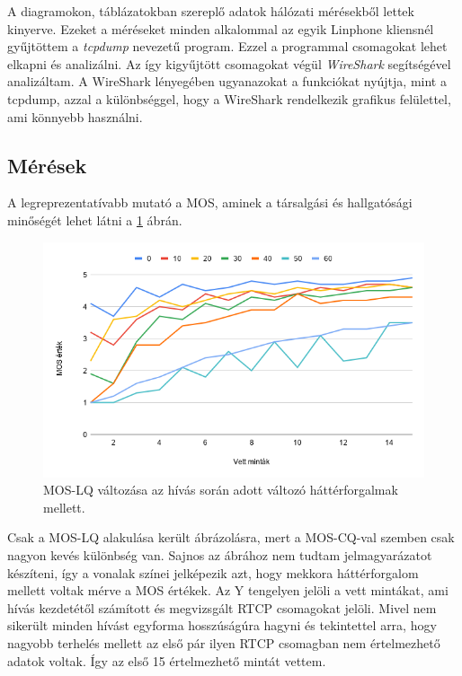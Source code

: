 A diagramokon, táblázatokban szereplő adatok hálózati mérésekből lettek kinyerve. Ezeket a méréseket 
minden alkalommal az egyik Linphone kliensnél gyűjtöttem a \textit{tcpdump} nevezetű program. Ezzel 
a programmal csomagokat lehet elkapni és analizálni. Az így kigyűjtött csomagokat végül \textit{WireShark}
segítségével analizáltam. A WireShark lényegében ugyanazokat a funkciókat nyújtja, mint a tcpdump, azzal
a különbséggel, hogy a WireShark rendelkezik grafikus felülettel, ami könnyebb használni. 

\subsection{Mérések}

A legreprezentatívabb mutató a MOS, aminek a társalgási és hallgatósági minőségét lehet látni a \ref{fig:moslq}
ábrán.

\begin{figure}[!ht]
	\centering
	\includegraphics[width=1\textwidth, keepaspectratio]{figures/moslq.png}
	\caption{MOS-LQ változása az hívás során adott változó háttérforgalmak mellett.}
	\label{fig:moslq}
\end{figure}

Csak a MOS-LQ alakulása került ábrázolásra, mert a MOS-CQ-val szemben csak nagyon kevés különbség
van. Sajnos az ábrához nem tudtam jelmagyarázatot készíteni, így a vonalak színei jelképezik azt, hogy
mekkora háttérforgalom mellett voltak mérve a MOS értékek. Az Y tengelyen jelöli a vett mintákat, 
ami hívás kezdetétől számított és megvizsgált RTCP csomagokat jelöli. Mivel nem sikerült minden hívást 
egyforma hosszúságúra hagyni és tekintettel arra, hogy nagyobb terhelés mellett az első pár ilyen 
RTCP csomagban nem értelmezhető adatok voltak. Így az első 15 értelmezhető mintát vettem. \\

